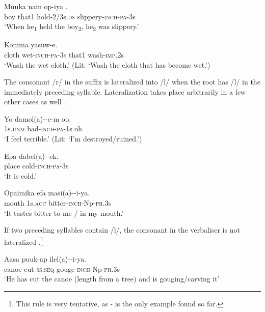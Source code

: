 \ea%
\label{ex:3:x1764}
\gll Muuka nain op-iya \textstyleEmphasizedVernacularWords{-}\textstyleEmphasizedVernacularWords{-}. \\
boy that1 hold-2/3s.\textsc{ds} slippery-\textsc{inch}-\textsc{pa}-3s\\
\glt`When he\textsubscript{1} held the boy\textsubscript{2}, he\textsubscript{2} was slippery.'
\z

\ea%
\label{ex:3:x83}
\gll {\ob}Konima   yasuw-e. \\
cloth wet-\textsc{inch}-\textsc{pa}-3s that1 wash-\textsc{imp}.2s\\
\glt`Wash the wet cloth.' (Lit: `Wash the cloth that has become wet.')
\z

The consonant /r/ in the suffix is lateralized into /l/ when the root has /l/ in the immediately preceding syllable. Lateralization takes place arbitrarily in a few other cases as well .

\ea%
\label{ex:3:x197}
\gll Yo damol(a)--e-m oo. \\
1s.\textsc{unm} bad-\textsc{inch}-\textsc{pa}-1s oh \\
\glt`I feel terrible.' (Lit: `I'm destroyed/ruined.') 
\z

\ea%
\label{ex:3:x198}
\gll Epa dabel(a)--ek. \\
place cold-\textsc{inch}-\textsc{pa}-3s \\
\glt`It is cold.'
\z

\ea%
\label{ex:3:x199}
\gll Opaimika efa masi(a)--i-ya. \\
mouth 1s.\textsc{acc} bitter-\textsc{inch}-Np-\textsc{pr}.3s \\
\glt`It tastes bitter to me / in my mouth.'
\z

If two preceding syllables contain /l/, the consonant in the verbaliser is not lateralized .\footnote{This rule is very tentative, as - is the only example found so far.}

\ea%
\label{ex:3:x200}
\gll Aasa puuk-ap ilel(a)--i-ya. \\
canoe cut-\textsc{ss}.\textsc{seq} gouge-\textsc{inch}-Np-\textsc{pr}.3s \\
\glt`He has cut the canoe (length from a tree) and is gouging/carving it' 
\z

